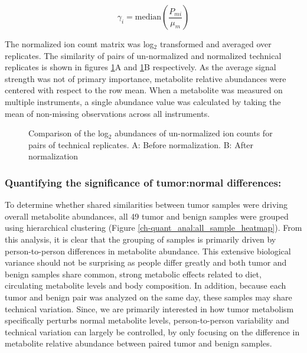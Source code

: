 \begin{equation}
\gamma_{i} = \text{median}\left(\frac{P_{mi}}{\mu_{m}}\right)
\label{normal}
\end{equation}

The normalized ion count matrix was log$_{2}$ transformed and averaged over replicates.  The similarity of pairs of un-normalized and normalized technical replicates is shown in figures \ref{ch-quant_anal:replicate_corr}A and \ref{ch-quant_anal:replicate_corr}B respectively.  As the average signal strength was not of primary importance, metabolite relative abundances were centered with respect to the row mean.  When a metabolite was measured on multiple instruments, a single abundance value was calculated by taking the mean of non-missing observations across all instruments.

\begin{figure}[h!]
\begin{center}
\hspace{1mm}

\caption[Comparison of the log$_{2}$ abundances of un-normalized ion counts for pairs of technical replicates]{Comparison of the log$_{2}$ abundances of un-normalized ion counts for pairs of technical replicates.  A: Before normalization. B: After normalization}
\label{ch-quant_anal:replicate_corr}
\end{center}
\end{figure}

\subsubsection{Quantifying the significance of tumor:normal differences:}

To determine whether shared similarities between tumor samples were driving overall metabolite abundances, all 49 tumor and benign samples were grouped using hierarchical clustering (Figure \ref{ch-quant_anal:all_sample_heatmap}). From this analysis, it is clear that the grouping of samples is primarily driven by person-to-person differences in metabolite abundance.  This extensive biological variance should not be surprising as people differ greatly and both tumor and benign samples share common, strong   metabolic effects related to diet, circulating metabolite levels and body composition.  In addition, because each tumor and benign pair was analyzed on the same day, these samples may share technical variation.  Since, we are primarily interested in how tumor metabolism specifically perturbs normal metabolite levels, person-to-person variability and technical variation can largely be controlled, by only focusing on the difference in metabolite relative abundance between paired tumor and benign samples. 

